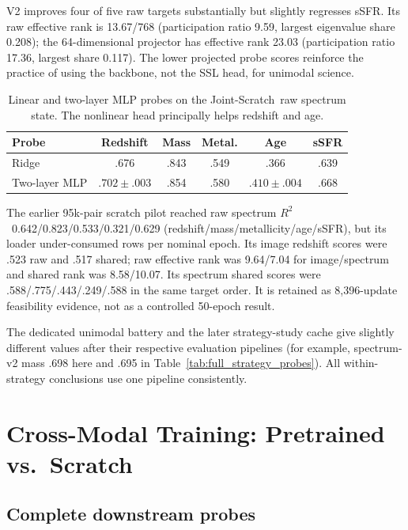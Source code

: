 \documentclass{article}
\newcommand{\joint}{Joint-Scratch}
\newcommand{\rscore}{$R^2$}
\begin{document}
V2 improves four of five raw targets substantially but slightly regresses
sSFR.
Its raw effective rank is 13.67/768 (participation ratio 9.59, largest
eigenvalue share 0.208); the 64-dimensional projector has effective rank
23.03 (participation ratio 17.36, largest share 0.117).
The lower projected probe scores reinforce the practice of using the backbone,
not the SSL head, for unimodal science.

\begin{table}[h]
\centering
\caption{Linear and two-layer MLP probes on the \joint\ raw spectrum state.
The nonlinear head principally helps redshift and age.}
\label{tab:nonlinear}
\small
\begin{tabular}{lccccc}
\toprule
Probe & Redshift & Mass & Metal. & Age & sSFR\\
\midrule
Ridge & .676 & .843 & .549 & .366 & .639\\
Two-layer MLP & $.702\pm.003$ & .854 & .580 & $.410\pm.004$ & .668\\
\bottomrule
\end{tabular}
\end{table}

The earlier 95k-pair scratch pilot reached raw spectrum \rscore\
0.642/0.823/0.533/0.321/0.629 (redshift/mass/metallicity/age/sSFR), but its
loader under-consumed rows per nominal epoch.
Its image redshift scores were .523 raw and .517 shared; raw effective rank was
9.64/7.04 for image/spectrum and shared rank was 8.58/10.07.
Its spectrum shared scores were .588/.775/.443/.249/.588 in the same target
order.
It is retained as 8,396-update feasibility evidence, not as a controlled
50-epoch result.

The dedicated unimodal battery and the later strategy-study cache give slightly
different values after their respective evaluation pipelines (for example,
spectrum-v2 mass .698 here and .695 in Table~\ref{tab:full_strategy_probes}).
All within-strategy conclusions use one pipeline consistently.

\clearpage
\section{Cross-Modal Training: Pretrained vs.\ Scratch}
\label{app:strategy}

\subsection{Complete downstream probes}
\end{document}
